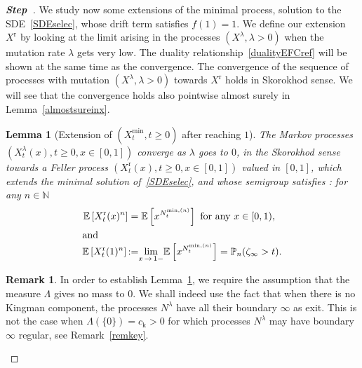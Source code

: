 \documentclass[10pt]{amsart}
\newtheorem{lemm}[theo]{Lemma}\newtheorem{prop}[theo]{Proposition}\newtheorem{coro}[theo]{Corollary}\newtheorem{conj}[theo]{Conjecture}
\theoremstyle{definition}\newtheorem{defi}[theo]{Definition}\newtheorem{rema}[theo]{Remark}\newtheorem{exam}[theo]{Example}\newtheorem{exem}[theo]{Example}\newtheorem{nota}[theo]{Notation}
\newcommand{\rmr}{\mathrm{r}}
\newcommand{\rmk}{\mathrm{k}}
\newcommand{\bbN}{\mathbb{N}}
\newcommand{\bbE}{\mathbb{E}}
\newcommand{\bbP}{\mathbb{P}}
\newcounter{stepcount}
\newenvironment{step}{\refstepcounter{stepcount}\begin{proof}[\textbf{Step~\thestepcount}]}{\end{proof}}
\begin{document}
\begin{step}
 We study now some extensions of the minimal process, solution to the SDE~\eqref{SDEselec}, whose drift term satisfies $f(1)=1$. We define our extension $X^{\rmr}$ by looking at the limit arising in the processes $(X^{\lambda},\lambda>0)$ when the mutation rate $\lambda$ gets very low. The duality relationship~\eqref{dualityEFCref} will be shown at the same time as the convergence. The convergence of the sequence of processes with mutation $(X^{\lambda},\lambda>0)$ towards $X^{\rmr}$ holds in Skorokhod sense. We will see that the convergence holds also pointwise almost surely in Lemma~\ref{almostsureinx}.


\begin{lemm}[Extension of $(X^{\min}_t,t\geq 0)$ after reaching $1$]\label{recextensX}
The Markov processes $(X^{\lambda}_t(x),t\geq 0, x\in [0,1])$ converge as $\lambda$ goes to $0$, in the Skorokhod sense towards a Feller process $(X_t^{\rmr}(x),t\geq 0,x\in [0,1])$ valued in $[0,1]$, which extends the minimal solution of~\eqref{SDEselec}, and whose semigroup satisfies : for any $n\in \bbN$
\begin{align}
\bbE\left[X^{\rmr}_t(x)^n\right] &=\bbE\left[x^{N^{\min,(n)}_t}\right]
\text{ for any } x\in [0,1),\label{dualabso}
\\
\intertext{and}
\bbE\left[X^{\rmr}_t(1)^n\right]\, &{:=}\underset{x\,\rightarrow\,1-}{\lim}\bbE\left[x^{N^{\min,(n)}_t}\right]=\bbP_n(\zeta_\infty>t).\label{entrancelawXr}
\end{align}
\end{lemm}

\begin{rema}\label{remwhynotkingman}
In order to establish Lemma~\ref{recextensX}, we require the assumption that the measure $\Lambda$ gives no mass to $0$. We shall indeed use the fact that when there is no Kingman component, the processes $N^{\lambda}$ have all their boundary $\infty$ as exit. This is not the case when $\Lambda(\{0\})=c_{\rmk}>0$ for which processes $N^{\lambda}$ may have boundary $\infty$ regular, see Remark~\ref{remkey}.
\end{rema}


\end{step}
\end{document}
